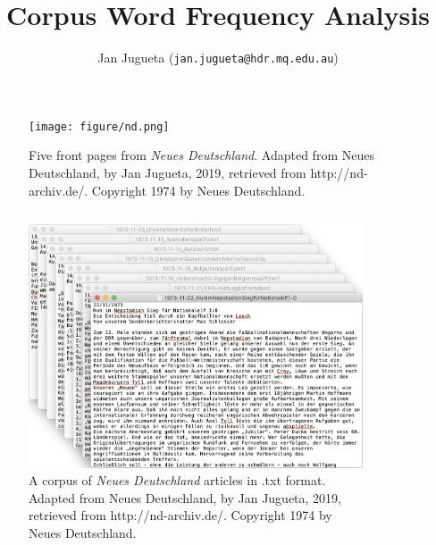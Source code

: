 \documentclass[unknownkeysallowed,usepdftitle=false,aspectratio=169, parskip=full]{beamer}
\title{Corpus Word Frequency Analysis}
\author{Jan Jugueta (\texttt{jan.jugueta@hdr.mq.edu.au})}
\institute{Macquarie University, North Ryde, NSW}
\newcommand{\secvariable}{nothing}
\newcommand{\mysection}[1]{\renewcommand{\secvariable}{#1}
}
\begin{document}
\mysection{abstract}
\begin{frame}\label{\secvariable}
\begin{center}
\begin{figure}[h]
\centering
\texttt{[image: figure/nd.png]}
\caption{Five front pages from \textit{Neues Deutschland}. Adapted from Neues Deutschland, by Jan Jugueta, 2019, retrieved from http://nd-archiv.de/. Copyright 1974 by Neues Deutschland.}
\end{figure}
\end{center}
\end{frame}

\begin{frame}\label{\secvariable}
  \begin{columns}[t]
  \begin{column}[c]{0.45\textwidth}
\begin{figure}[h]
\centering
\includegraphics[width=1\textwidth,height=1\textheight,keepaspectratio]{figure/corpus.png}
\caption{A corpus of \textit{Neues Deutschland} articles in .txt format. Adapted from Neues Deutschland, by Jan Jugueta, 2019, retrieved from http://nd-archiv.de/. Copyright 1974 by Neues Deutschland.}
\end{figure}
    \end{column}
    \begin{column}[c]{0.45\textwidth}
    \begin{figure}[h]
\centering

\end{figure}
\end{column}
\end{columns}
\end{frame}
\end{document}
